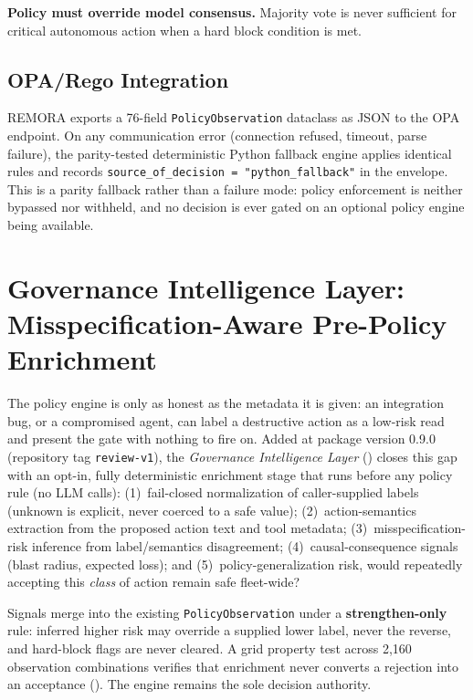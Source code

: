 \documentclass[10pt,twocolumn]{article}
\begin{document}
\noindent\textbf{Policy must override model consensus.} Majority vote
is never sufficient for critical autonomous action when a hard block
condition is met.

\subsection{OPA/Rego Integration}

REMORA exports a 76-field \texttt{PolicyObservation} dataclass as
JSON to the OPA endpoint. On any communication error (connection
refused, timeout, parse failure), the parity-tested deterministic
Python fallback engine applies
identical rules and records \texttt{source\_of\_decision =
"python\_fallback"} in the envelope. This is a parity fallback rather
than a failure mode: policy enforcement is neither bypassed nor
withheld, and no decision is ever gated on an optional policy engine
being available.

\section{Governance Intelligence Layer: Misspecification-Aware Pre-Policy Enrichment}
\label{sec:gov_intel}

The policy engine is only as honest as the metadata it is given: an
integration bug, or a compromised agent, can label a destructive
action as a low-risk read and present the gate with nothing to fire
on. Added at package version 0.9.0 (repository tag \texttt{review-v1}), the \emph{Governance Intelligence
Layer} () closes this gap with
an opt-in, fully deterministic enrichment stage that runs before any
policy rule (no LLM calls): (1)~fail-closed normalization of
caller-supplied labels (unknown is explicit, never coerced to a safe
value); (2)~action-semantics extraction from the proposed action text
and tool metadata; (3)~misspecification-risk inference from
label/semantics disagreement; (4)~causal-consequence signals \cite{bjoru2026causal,pearl2009causality} (blast
radius, expected loss); and (5)~policy-generalization risk, would
repeatedly accepting this \emph{class} of action remain safe
fleet-wide?

Signals merge into the existing \texttt{PolicyObservation} under a
\textbf{strengthen-only} rule: inferred higher risk may override a
supplied lower label, never the reverse, and hard-block flags are
never cleared. A grid property test across 2{,}160 observation
combinations verifies that enrichment never converts a rejection into
an acceptance
().
The engine remains the sole decision authority.
\end{document}
